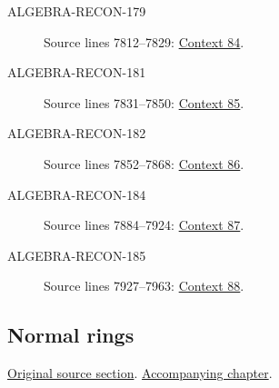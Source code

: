 \begin{description}
\item[ALGEBRA-RECON-179] Source lines 7812--7829: \hyperlink{algebra-context-084}{Context 84}.
\item[ALGEBRA-RECON-181] Source lines 7831--7850: \hyperlink{algebra-context-085}{Context 85}.
\item[ALGEBRA-RECON-182] Source lines 7852--7868: \hyperlink{algebra-context-086}{Context 86}.
\item[ALGEBRA-RECON-184] Source lines 7884--7924: \hyperlink{algebra-context-087}{Context 87}.
\item[ALGEBRA-RECON-185] Source lines 7927--7963: \hyperlink{algebra-context-088}{Context 88}.
\end{description}

\subsection{Normal rings}
\hypertarget{algebra-source-section-normal-rings}{}
\noindent\href{https://github.com/stacks/stacks-project/blob/a04446e57ec1fbc252a871afcec7752fb2807b14/algebra.tex\#L7971}{Original source section}. \href{algebra.pdf\#nameddest=section-normal-rings}{Accompanying chapter}.

